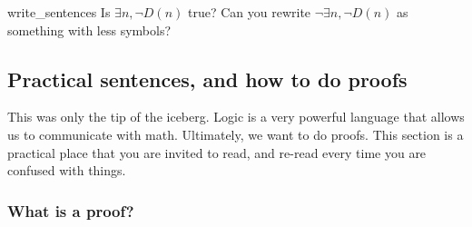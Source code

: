 \begin{cex}{}{write_sentences}
    Is \( \exists n, \neg D(n) \) true? Can you rewrite \( \neg \exists n, \neg D(n) \) as something with less symbols?
\end{cex}


\subsection{Practical sentences, and how to do proofs}

This was only the tip of the iceberg. Logic is a very powerful language that allows us to communicate with math. Ultimately, we want to do proofs. This section is a practical place that you are invited to read, and re-read every time you are confused with things. 

\subsubsection{What is a proof?}

